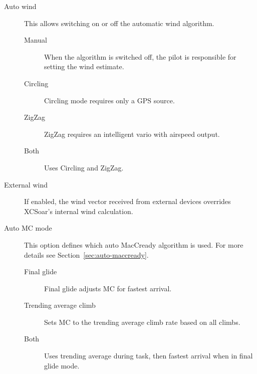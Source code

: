 \begin{description}
\item[Auto wind]  \label{conf:autowind} This allows switching on or off the
 automatic wind algorithm.
\begin{description}
 \item[Manual]  When the algorithm is switched off, the pilot is responsible for
  setting the wind estimate.
 \item[Circling]  Circling mode requires only a GPS source.
 \item[ZigZag]  ZigZag requires an intelligent vario with airspeed output.
 \item[Both]  Uses Circling and ZigZag.
\end{description}

\item[External wind]  If enabled, the wind vector received from external
 devices overrides XCSoar's internal wind calculation.
\item[Auto MC mode]  This option defines which auto MacCready algorithm is used.
 For more details see Section~\ref{sec:auto-maccready}.
\begin{description}
 \item[Final glide]  Final glide adjusts MC for fastest arrival.
 \item[Trending average climb]  Sets MC to the trending average climb rate based on all climbs.
 \item[Both]  Uses trending average during task, then fastest arrival when in final glide mode.
\end{description}


\end{description}
